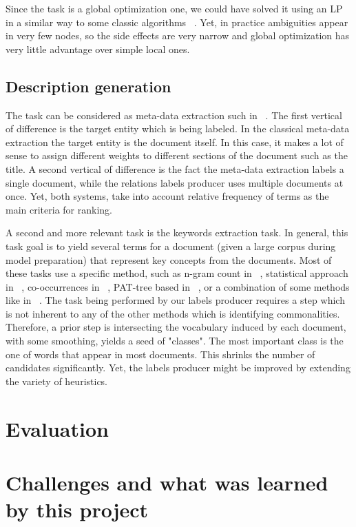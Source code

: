 \documentclass[11pt,a4paper]{article}
\begin{document}
Since the task is a global optimization one, we could have solved it using an LP in a similar way to some classic algorithms ~\cite{aumann1998log}. Yet, in practice ambiguities appear in very few nodes, so the side effects are very narrow and global optimization has very little advantage over simple local ones.

\subsection{Description generation}

The task can be considered as meta-data extraction such in ~\cite{yilmazel2004metaextract}. The first vertical of difference is the target entity which is being labeled. In the classical meta-data extraction the target entity is the document itself. In this case, it makes a lot of sense to assign different weights to different sections of the document such as the title. A second vertical of difference is the fact the meta-data extraction labels a single document, while the relations labels producer uses multiple documents at once. Yet, both systems, take into account relative frequency of terms as the main criteria for ranking.

A second and more relevant task is the keywords extraction task. In general, this task goal is to yield several terms for a document (given a large corpus during model preparation) that represent key concepts from the documents. Most of these tasks use a specific method, such as n-gram count in ~\cite{cohen1995highlights}, statistical approach in ~\cite{luhn1957statistical}, co-occurrences in ~\cite{matsuo2004keyword}, PAT-tree based in ~\cite{chien1997pat}, or a combination of some methods like in ~\cite{zhang2008automatic}. The task being performed by our labels producer requires a step which is not inherent to any of the other methods which is identifying commonalities. Therefore, a prior step is intersecting the vocabulary induced by each document, with some smoothing, yields a seed of "classes". The most important class is the one of words that appear in most documents. This shrinks the number of candidates significantly. Yet, the labels producer might be improved by extending the variety of heuristics.

\section{Evaluation}

\section{Challenges and what was learned by this project}
\end{document}
